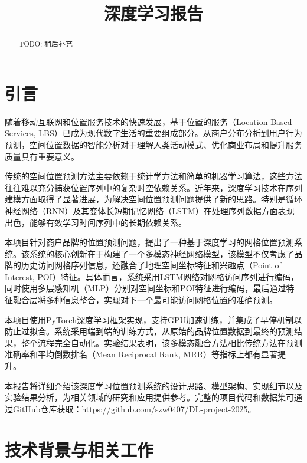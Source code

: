 \documentclass{article}
\title{深度学习报告}
\begin{document}
\maketitle

\begin{abstract}
      TODO: 稍后补充
\end{abstract}

\newpage

\tableofcontents
\newpage
\section{引言}

随着移动互联网和位置服务技术的快速发展，基于位置的服务（Location-Based Services, LBS）已成为现代数字生活的重要组成部分。从商户分布分析到用户行为预测，空间位置数据的智能分析对于理解人类活动模式、优化商业布局和提升服务质量具有重要意义。

传统的空间位置预测方法主要依赖于统计学方法和简单的机器学习算法，这些方法往往难以充分捕获位置序列中的复杂时空依赖关系。近年来，深度学习技术在序列建模方面取得了显著进展，为解决空间位置预测问题提供了新的思路。特别是循环神经网络（RNN）及其变体长短期记忆网络（LSTM）在处理序列数据方面表现出色，能够有效学习时间序列中的长期依赖关系。

本项目针对商户品牌的位置预测问题，提出了一种基于深度学习的网格位置预测系统。该系统的核心创新在于构建了一个多模态神经网络模型，该模型不仅考虑了品牌的历史访问网格序列信息，还融合了地理空间坐标特征和兴趣点（Point of Interest, POI）特征。具体而言，系统采用LSTM网络对网格访问序列进行编码，同时使用多层感知机（MLP）分别对空间坐标和POI特征进行编码，最后通过特征融合层将多种信息整合，实现对下一个最可能访问网格位置的准确预测。

本项目使用PyTorch深度学习框架实现，支持GPU加速训练，并集成了早停机制以防止过拟合。系统采用端到端的训练方式，从原始的品牌位置数据到最终的预测结果，整个流程完全自动化。实验结果表明，该多模态融合方法相比传统方法在预测准确率和平均倒数排名（Mean Reciprocal Rank, MRR）等指标上都有显著提升。

本报告将详细介绍该深度学习位置预测系统的设计思路、模型架构、实现细节以及实验结果分析，为相关领域的研究和应用提供参考。完整的项目代码和数据集可通过GitHub仓库获取：\url{https://github.com/szw0407/DL-project-2025}。

\section{技术背景与相关工作}
\end{document}
